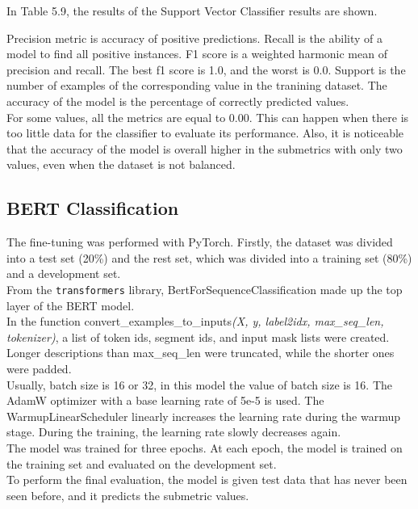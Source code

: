 \documentclass[times, utf8, zavrsni, english]{fer}
\begin{document}
In Table 5.9, the results of the Support Vector Classifier results are shown. 

Precision metric is accuracy of positive predictions. Recall is the ability of a model to find all positive instances. F1 score is a weighted harmonic mean of precision and recall. The best f1 score is 1.0, and the worst is 0.0. Support is the number of examples of the corresponding value in the tranining dataset.
The accuracy of the model is the percentage of correctly predicted values. \\

For some values, all the metrics are equal to 0.00. This can happen when there is too little data for the classifier to evaluate its performance. Also, it is noticeable that the accuracy of the model is overall higher in the submetrics with only two values, even when the dataset is not balanced.


\subsection{BERT Classification}
The fine-tuning was performed with PyTorch.
Firstly, the dataset was divided into a test set (20\%) and the rest set, which was divided into a training set (80\%) and a development set.\\
From the \texttt{transformers} library, BertForSequenceClassification made up the top layer of the BERT model.\\
In the function convert\_examples\_to\_inputs\textit{(X, y, label2idx, max\_seq\_len, tokenizer)}, a list of token ids, segment ids, and input mask lists were created. Longer descriptions than max\_seq\_len were truncated, while the shorter ones were padded. \\
Usually, batch size is 16 or 32, in this model the value of batch size is 16.
The AdamW optimizer with a base learning rate of 5e-5  is used. The WarmupLinearScheduler linearly increases the learning rate during the warmup stage. During the training, the learning rate slowly decreases again.\\
The model was trained for three epochs.
At each epoch, the model is trained on the training set and evaluated on the development set. \\
To perform the final evaluation, the model is given test data that has never been seen before, and it predicts the submetric values. \\
\end{document}
